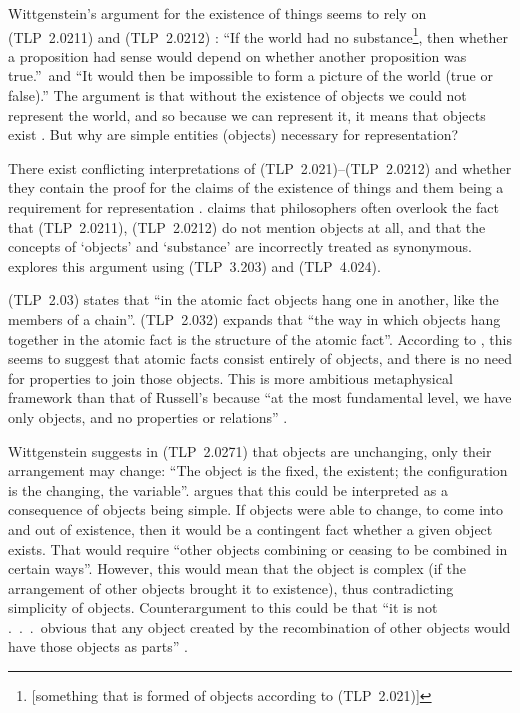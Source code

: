 \documentclass{article}
\newcommand{\prop}[1]{(TLP~#1)}
\begin{document}
Wittgenstein's argument for the existence of things seems to rely on \prop{2.0211} and \prop{2.0212} \cite{Sp2007}: ``If the world had no substance\footnote{[something that is formed of objects according to \prop{2.021}]}, then whether a proposition had sense would depend on whether another proposition was true.''\ and ``It would then be impossible to form a picture of the world (true or false).''
The argument is that without the existence of objects we could not represent the world, and so because we can represent it, it means that objects exist \cite{Sp2007}.
But why are simple entities (objects) necessary for representation?

There exist conflicting interpretations of \prop{2.021}--\prop{2.0212} and whether they contain the proof for the claims of the existence of things and them being a requirement for representation \cite{Lu1976, Gr1964, We1935, An1959, Pi1964}. 
\cite{Lu1976} claims that philosophers often overlook the fact that \prop{2.0211}, \prop{2.0212} do not mention objects at all, and that the concepts of `objects' and `substance' are incorrectly treated as synonymous.
\cite{Sp2007} explores this argument using \prop{3.203} and \prop{4.024}.

\prop{2.03} states that ``in the atomic fact objects hang one in another, like the members of a chain''.
\prop{2.032} expands that ``the way in which objects hang together in the atomic fact is the structure of the atomic fact''.
According to \cite{Sp}, this seems to suggest that atomic facts consist entirely of objects, and there is no need for properties to join those objects.
This is more ambitious metaphysical framework than that of Russell's because ``at the most fundamental level, we have only objects, and no properties or relations'' \cite{Sp}.

Wittgenstein suggests in \prop{2.0271} that objects are unchanging, only their arrangement may change: ``The object is the fixed, the existent; the configuration is the changing, the variable''.
\cite{Sp} argues that this could be interpreted as a consequence of objects being simple.
If objects were able to change, to come into and out of existence, then it would be a contingent fact whether a given object exists.
That would require ``other objects combining or ceasing to be combined in certain ways''.
However, this would mean that the object is complex (if the arrangement of other objects brought it to existence), thus contradicting simplicity of objects.
Counterargument to this could be that ``it is not .\ .\ .\ obvious that any object created by the recombination of other objects would have those objects as parts'' \cite{Sp}.

\printbibliography[title=References]
\end{document}
